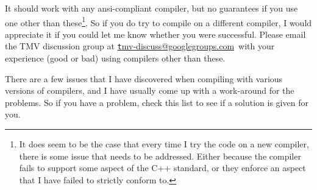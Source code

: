 \documentclass[twoside,letterpaper,11pt]{article}
\makeatletter
\newcommand{\mygroupx}{tmv-discuss@googlegroups.com}
\newcommand{\mygroup}{\href{mailto:\mygroupx}{\texttt \mygroupx}}
\makeatother
\begin{document}
It should work with any ansi-compliant
compiler, but no guarantees if you use one other than these\footnote{
It does seem to be the case that 
every time I try the code on a new compiler, there is some issue that needs to be addressed.  
Either because the compiler fails to support some aspect of the C++ standard, or they enforce
an aspect that I have failed to strictly conform to.}.
  So if you do try to compile on a different compiler, 
I would appreciate it if you could let me know whether you were successful.  
Please email the TMV discussion group at \mygroup\ with your experience (good or bad) using 
compilers other than these.

There are a few issues that I have discovered when compiling with various 
versions of compilers, and I have usually come up with a work-around for
the problems.  So if you have a problem, check this list to see if a solution
is given for you.  
\end{document}
